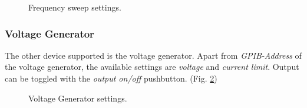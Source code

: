 \begin{figure}[H]
\centering
{}
\caption{Frequency sweep settings.}
\label{fig:freqsw}
\end{figure}

\subsubsection*{Voltage Generator}
The other device supported is the voltage generator. Apart from \emph{GPIB-Address} of the voltage generator, the available settings are \emph{voltage} and \emph{current limit}. Output can be toggled with the \emph{output on/off} pushbutton. (Fig. \ref{fig:voltgen})

\begin{figure}[H]
\centering
{}
\caption{Voltage Generator settings.}
\label{fig:voltgen}
\end{figure}

\ifdefined\master
\else
	
\fi